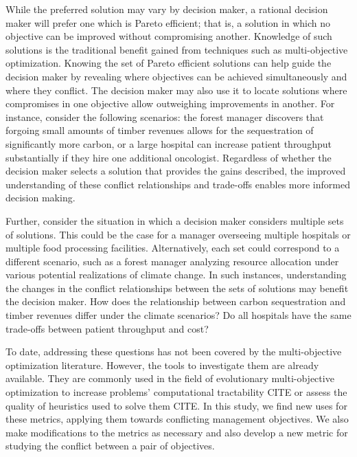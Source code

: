While the preferred solution may vary by decision maker, a rational decision maker will prefer one which is Pareto efficient; that is, a solution in which no objective can be improved without compromising another. Knowledge of such solutions is the traditional benefit gained from techniques such as multi-objective optimization. Knowing the set of Pareto efficient solutions can help guide the decision maker by revealing where objectives can be achieved simultaneously and where they conflict. The decision maker may also use it to locate solutions where compromises in one objective allow outweighing improvements in another. For instance, consider the following scenarios:
the forest manager discovers that forgoing small amounts of timber revenues allows for the sequestration of significantly more carbon, or
a large hospital can increase patient throughput substantially if they hire one additional oncologist.
Regardless of whether the decision maker selects a solution that provides the gains described, the improved understanding of these conflict relationships and trade-offs enables more informed decision making.

Further, consider the situation in which a decision maker considers multiple sets of solutions. This could be the case for a manager overseeing multiple hospitals or multiple food processing facilities. Alternatively, each set could correspond to a different scenario, such as a forest manager analyzing resource allocation under various potential realizations of climate change. In such instances, understanding the changes in the conflict relationships between the sets of solutions may benefit the decision maker. How does the relationship between carbon sequestration and timber revenues differ under the climate scenarios? Do all hospitals have the same trade-offs between patient throughput and cost?

To date, addressing these questions has not been covered by the multi-objective optimization literature. However, the tools to investigate them are already available. They are commonly used in the field of evolutionary multi-objective optimization to increase problems' computational tractability CITE or assess the quality of heuristics used to solve them CITE. In this study, we find new uses for these metrics, applying them towards conflicting management objectives. We also make modifications to the metrics as necessary and also develop a new metric for studying the conflict between a pair of objectives.

